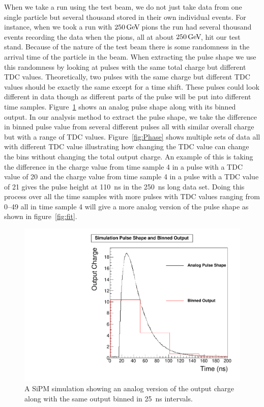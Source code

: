When we take a run using the test beam, we do not just take data from one single particle but several thousand stored in their own individual events. For instance, when we took a run with $250{\,\text{Ge\hspace{-.08em}V\hspace{-0.16em}}}$ pions the run had several thousand events recording the data when the pions, all at about $250{\,\text{Ge\hspace{-.08em}V\hspace{-0.16em}}}$, hit our test stand. Because of the nature of the test beam there is some randomness in the arrival time of the particle in the beam. When extracting the pulse shape we use this randomness by looking at pulses with the same total charge but different TDC values. Theoretically, two pulses with the same charge but different TDC values should be exactly the same except for a time shift. These pulses could look different in data though as different parts of the pulse will be put into different time samples. Figure~\ref{fig:bin} shows an analog pulse shape along with its binned output. In our analysis method to extract the pulse shape, we take the difference in binned pulse value from several different pulses all with similar overall charge but with a range of TDC values. Figure~\ref{fig:Phase} shows multiple sets of data all with different TDC value illustrating how changing the TDC value can change the bins without changing the total output charge. An example of this is taking the difference in the charge value from time sample 4 in a pulse with a TDC value of 20 and the charge value from time sample 4 in a pulse with a TDC value of 21 gives the pulse height at 110~ns in the 250~ns long data set. Doing this process over all the time samples with more pulses with TDC values ranging from 0--49 all in time sample 4 will give a more analog version of the pulse shape as shown in figure~\ref{fig:fit}.

\begin{figure}
\centering
\includegraphics[width=0.6\linewidth]{Figures/Bin.pdf}
\caption{A SiPM simulation showing an analog version of the output charge along with the same output binned in 25~ns intervals.}
\label{fig:bin}
\end{figure}

